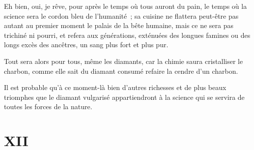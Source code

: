\documentclass[french,twoside]{book} %
\newcommand\chapteropen{} %
\newcommand\chapterclose{} %
\begin{document}
Eh bien, oui, je rêve, pour après le temps où tous auront du pain, le temps où la science sera le cordon bleu de l’humanité ; sa cuisine ne flattera peut-être pas autant au premier moment le palais de la bête humaine, mais ce ne sera pas  trichiné ni pourri, et refera aux générations, exténuées des longues famines ou des longs excès des ancêtres, un sang plus fort et plus pur.\par
Tout sera alors pour tous, même les diamants, car la chimie saura cristalliser le charbon, comme elle sait du diamant consumé refaire la cendre d’un charbon.\par
Il est probable qu’à ce moment-là bien d’autres richesses et de plus beaux triomphes que le diamant vulgarisé appartiendront à la science qui se servira de toutes les forces de la nature.
\chapterclose


\chapteropen
 \chapter[{XII}]{XII}
\label{p1.12}
\end{document}
